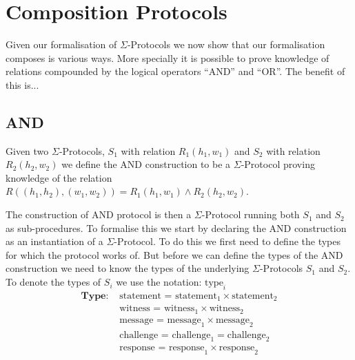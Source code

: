 \section{Composition Protocols}
\label{sec:sigma_comp}
Given our formalisation of $\Sigma$-Protocols we now show that our formalisation
composes is various ways. More specially it is possible to prove knowledge of
relations compounded by the logical operators ``AND'' and ``OR''.
The benefit of this is...

\subsection{AND}
\label{subsec:sigma_AND}
Given two $\Sigma$-Protocols, $S_{1}$ with relation $R_{1}(h_{1},w_{1})$ and
$S_{2}$ with relation $R_{2}(h_{2},w_{2})$ we define the AND construction to be a
$\Sigma$-Protocol proving knowledge of the relation
$R((h_{1}, h_{2}), (w_{1}, w_{2})) = R_{1}(h_{1}, w_{1}) \land R_{2}(h_{2}, w_{2})$.

The construction of AND protocol is then a $\Sigma$-Protocol running both
$S_{1}$ and $S_{2}$ as sub-procedures. To formalise this we start by declaring
the AND construction as an instantiation of a $\Sigma$-Protocol. To do this we
first need to define the types for which the protocol works of. But before we
can define the types of the AND construction we need to know the types of the
underlying $\Sigma$-Protocols $S_{1}$ and $S_{2}$. To denote the types of
$S_{i}$ we use the notation: $\text{type}_i$
\begin{align*}
  \textbf{Type: } &\text{statement = statement}_{1} \times \text{statement}_{2} \\
                  &\text{witness = witness}_{1} \times \text{witness}_{2} \\
                  &\text{message = message}_{1} \times \text{message}_{2} \\
                  &\text{challenge = challenge}_{1} = \text{challenge}_{2} \\
                  &\text{response = response}_{1} \times \text{response}_{2} \\
\end{align*}


